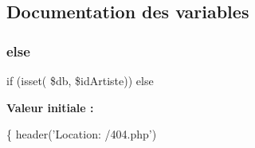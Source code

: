 \subsection{Documentation des variables}
\mbox{\label{artiste_8php_a89dd00533ed3c247956b647fb12d186a}} 
\subsubsection{\texorpdfstring{else}{else}}
{\footnotesize\ttfamily if (isset( \$db, \$id\+Artiste)) else}

{\bfseries Valeur initiale \+:}
\begin{DoxyCode}
\{
    header(\textcolor{stringliteral}{'Location: /404.php'})
\end{DoxyCode}
